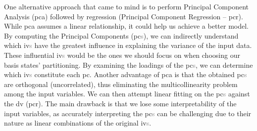 One alternative approach that came to mind is to perform Principal Component Analysis (\acrshort{pca}) followed by regression (Principal Component Regression – \acrshort{pcr}). While \acrshort{pca} assumes a linear relationship, it could help us achieve a better model. By computing the Principal Components (\acrshort{pc}\textcolor{gray}{s}), we can indirectly understand which \acrshort{iv}\textcolor{gray}{s} have the greatest influence in explaining the variance of the input data. These influential \acrshort{iv}\textcolor{gray}{s} would be the ones we should focus on when choosing our basis states' partitioning. By examining the loadings of the \acrshort{pc}\textcolor{gray}{s}, we can determine which \acrshort{iv}\textcolor{gray}{s} constitute each \acrshort{pc}. Another advantage of \acrshort{pca} is that the obtained \acrshort{pc}\textcolor{gray}{s} are orthogonal (uncorrelated), thus eliminating the multicollinearity problem among the input variables. We can then attempt linear fitting on the \acrshort{pc}\textcolor{gray}{s} against the \acrshort{dv} (\acrshort{pcr}). The main drawback is that we lose some interpretability of the input variables, as accurately interpreting the \acrshort{pc}\textcolor{gray}{s} can be challenging due to their nature as linear combinations of the original \acrshort{iv}\textcolor{gray}{s}.

